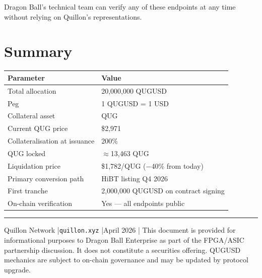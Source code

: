 \documentclass[11pt,a4paper]{article}
\begin{document}
Dragon Ball's technical team can verify any of these endpoints at any time
without relying on Quillon's representations.

\section{Summary}

\begin{center}
\begin{tabular}{ll}
\toprule
\textbf{Parameter} & \textbf{Value} \\
\midrule
Total allocation          & 20,000,000 QUGUSD \\
Peg                       & 1 QUGUSD = 1 USD \\
Collateral asset          & QUG \\
Current QUG price         & \$2,971 \\
Collateralisation at issuance & 200\% \\
QUG locked                & $\approx$13,463 QUG \\
Liquidation price         & \$1,782/QUG ($-$40\% from today) \\
Primary conversion path   & HiBT listing Q4 2026 \\
First tranche             & 2,000,000 QUGUSD on contract signing \\
On-chain verification     & Yes — all endpoints public \\
\bottomrule
\end{tabular}
\end{center}

\vspace{2em}
\hrule
\vspace{0.5em}
{\small\color{gray}
Quillon Network \quad|\quad \texttt{quillon.xyz} \quad|\quad April 2026 \quad|\quad
This document is provided for informational purposes to Dragon Ball Enterprise as part of the FPGA/ASIC partnership discussion.
It does not constitute a securities offering.
QUGUSD mechanics are subject to on-chain governance and may be updated by protocol upgrade.
}
\end{document}
